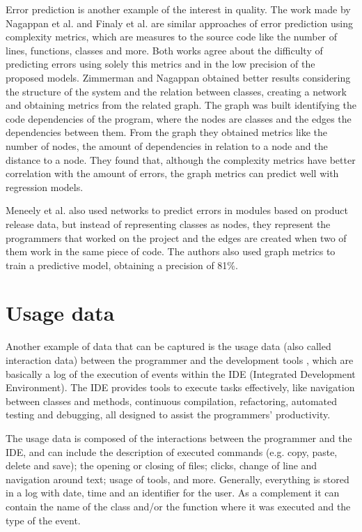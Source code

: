 Error prediction is another example of the interest in quality. The work made by Nagappan et al. \cite{NBZ06} and Finaly et al. \cite{FPC14} are similar approaches of error prediction using complexity metrics, which are measures to the source code like the number of lines, functions, classes and more. Both works agree about the difficulty of predicting errors using solely this metrics and in the low precision of the proposed models. Zimmerman and Nagappan \cite{ZN08} obtained better results considering the structure of the system and the relation between classes, creating a network and obtaining metrics from the related graph. The graph was built identifying the code dependencies of the program, where the nodes are classes and the edges the dependencies between them. From the graph they obtained metrics like the number of nodes, the amount of dependencies in relation to a node and the distance to a node. They found that, although the complexity metrics have better correlation with the amount of errors, the graph metrics can predict well with regression models.

Meneely et al. \cite{MWS08} also used networks to predict errors in modules based on product release data, but instead of representing classes as nodes, they represent the programmers that worked on the project and the edges are created when two of them work in the same piece of code. The authors also used graph metrics to train a predictive model, obtaining a precision of 81\%.

\section{Usage data }
Another example of data that can be captured is the usage data (also called interaction data) between the programmer and the development tools \cite{SnipesETALASD}, which are basically a log of the execution of events within the IDE (Integrated Development Environment). The IDE provides tools to execute tasks effectively, like navigation between classes and methods, continuous compilation, refactoring, automated testing and debugging, all designed to assist the programmers' productivity.

The usage data is composed of the interactions between the programmer and the IDE, and can include the description of executed commands (e.g. copy, paste, delete and save); the opening or closing of files; clicks, change of line and navigation around text; usage of tools, and more. Generally, everything is stored in a log with date, time and an identifier for the user. As a complement it can contain the name of the class and/or the function where it was executed and the type of the event.

